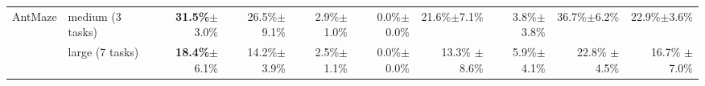 \begin{table*}[ht]
\begin{center}
{\begin{tabular}{l|l|rrrrrr|rr}
    \midrule
    AntMaze    & medium (3 tasks)  &\textbf{31.5\%}$\pm$3.0\% & 26.5\%$\pm$9.1\%  & 2.9\%$\pm$1.0\%  & 0.0\%$\pm$0.0\%  & 21.6\%$\pm$7.1\% & 3.8\%$\pm$3.8\% & 36.7\%$\pm$6.2\%  & 22.9\%$\pm$3.6\%\\
    & large (7 tasks)  & \textbf{18.4\%}$\pm$6.1\% & 14.2\%$\pm$3.9\% & 2.5\%$\pm$1.1\% & 0.0\%$\pm$0.0\% & 13.3\% $\pm$ 8.6\% & 5.9\%$\pm$4.1\% & 22.8\% $\pm$ 4.5\% & 16.7\% $\pm$ 7.0\%\\
    \bottomrule
    \end{tabular}}
    \end{center}
    \vspace{-0.1cm}
    \label{tbl:gym}
    \normalsize
    \end{table*}
    
    
    \begin{table*}[ht]
    \vspace*{-0.2cm}
    \caption{\footnotesize Results for multi-task imaged-based robotic manipulation domains in \citep{yu2021conservative}. Numbers are averaged across 3 seeds, $\pm$ the 95$\%$ confidence interval. UDS outperforms No Sharing in 7 out of 10 tasks as well as the average task performance, while performing comparably to Sharing All. CDS+UDS further improves the performance of UDS and outperforms No Sharing in all of the 10 tasks.
    }
    \vspace{-0.3cm}
    \small{
    \begin{center}
\end{center}}
\end{table*}
